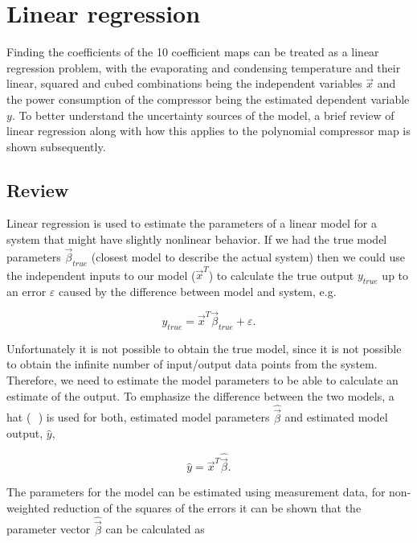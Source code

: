 \section{Linear regression}
\label{sec:linear_regression}
Finding the coefficients of the 10 coefficient maps can be treated as a linear regression problem, with the evaporating and condensing temperature and their linear, squared and cubed combinations being the independent variables ${\vec x}$ and the power consumption of the compressor being the estimated dependent variable $y$. To better understand the uncertainty sources of the model, a brief review of linear regression along with how this applies to the polynomial compressor map is shown subsequently.

\subsection{Review}
\label{sec:linreg_review}
Linear regression is used to estimate the parameters of a linear model for a system that might have slightly nonlinear behavior.  If we had the true model parameters ${\vec \beta _{true}} $ (closest model to describe the actual system) then we could use the independent inputs to our model (${\vec x^T}$) to calculate the true output $y_{true}$ up to an error $\varepsilon$ caused by the difference between model and system, e.g.

\begin{equation}
{y_{true}} = {\vec x^T}{\vec \beta _{true}} + \varepsilon.
\label{eq:true_lin_model}
\end{equation}

Unfortunately it is not possible to obtain the true model, since it is not possible to obtain the infinite number of input/output data points from the system. Therefore, we need to estimate the model parameters to be able to calculate an estimate of the output. To emphasize the difference between the two models, a hat ( $\hat{}$ ) is used for both, estimated model parameters $\hat {\vec \beta}$ and estimated model output, $\hat y$,

\begin{equation}
\hat y = {\vec x^T}\hat {\vec \beta}.
\label{eq:estimted_lin_model}
\end{equation}

The parameters for the model can be estimated using measurement data, for non-weighted reduction of the squares of the errors it can be shown that the  parameter vector $\hat {\vec \beta}$ can be calculated as

